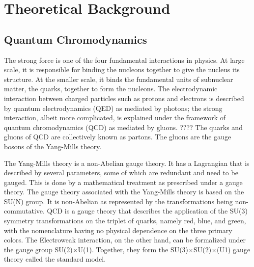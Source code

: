 \chapter{Theoretical Background} \label{ch:background}




\section{Quantum Chromodynamics}\label{section:QCD}
The strong force is one of the four fundamental interactions in physics. At large scale, it is responsible for binding the nucleons together to give the nucleus its structure. At the smaller scale, it binds the fundamental units of subnuclear matter, the quarks, together to form the nucleons. The electrodynamic interaction between charged particles such as protons and electrons is described by quantum electrodynamics (QED) as mediated by photons; the strong interaction, albeit more complicated, is explained under the framework of quantum chromodynamics (QCD) as mediated by gluons. \cite{KAPUSTA1979461, Shuryak1988} ???? The quarks and gluons of QCD are collectively known as partons. The gluons are the gauge bosons of the Yang-Mills theory.

The Yang-Mills theory is a non-Abelian gauge theory. It has a Lagrangian that is described by several parameters, some of which are redundant and need to be gauged. This is done by a mathematical treatment as prescribed under a gauge theory. The gauge theory associated with the Yang-Mills theory is based on the SU(N) group. It is non-Abelian as represented by the transformations being non-commutative. QCD is a gauge theory that describes the application of the SU(3) symmetry transformations on the triplet of quarks, namely red, blue, and green, with the nomenclature having no physical dependence on the three primary colors. The Electroweak interaction, on the other hand, can be formalized under the gauge group SU(2)$\times$U(1). Together, they form the SU(3)$\times$SU(2)$\times$(U1) gauge theory called the standard model.

